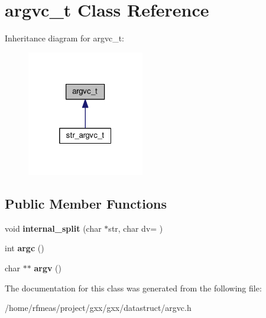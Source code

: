 \hypertarget{classargvc__t}{}\section{argvc\+\_\+t Class Reference}
\label{classargvc__t}


Inheritance diagram for argvc\+\_\+t\+:
\nopagebreak
\begin{figure}[H]
\begin{center}
\leavevmode
\includegraphics[width=145pt]{classargvc__t__inherit__graph}
\end{center}
\end{figure}
\subsection*{Public Member Functions}
\begin{DoxyCompactItemize}
\item 
void {\bfseries internal\+\_\+split} (char $\ast$str, char dv= \textquotesingle{} \textquotesingle{})\hypertarget{classargvc__t_abd61d46968ac80d6d58610340cdaa508}{}\label{classargvc__t_abd61d46968ac80d6d58610340cdaa508}

\item 
int {\bfseries argc} ()\hypertarget{classargvc__t_a769c05c3d5ef114497fec61afffeaa90}{}\label{classargvc__t_a769c05c3d5ef114497fec61afffeaa90}

\item 
char $\ast$$\ast$ {\bfseries argv} ()\hypertarget{classargvc__t_a5f9c39052a39f09702cb96f6932176fd}{}\label{classargvc__t_a5f9c39052a39f09702cb96f6932176fd}

\end{DoxyCompactItemize}


The documentation for this class was generated from the following file\+:\begin{DoxyCompactItemize}
\item 
/home/rfmeas/project/gxx/gxx/datastruct/argvc.\+h\end{DoxyCompactItemize}

